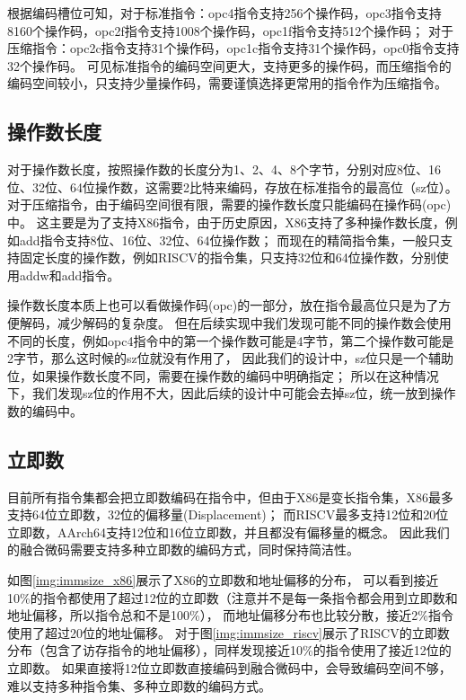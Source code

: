 根据编码槽位可知，对于标准指令：opc4指令支持256个操作码，opc3指令支持8160个操作码，opc2f指令支持1008个操作码，opc1f指令支持512个操作码；
对于压缩指令：opc2c指令支持31个操作码，opc1c指令支持31个操作码，opc0指令支持32个操作码。
可见标准指令的编码空间更大，支持更多的操作码，而压缩指令的编码空间较小，只支持少量操作码，需要谨慎选择更常用的指令作为压缩指令。

\subsection{操作数长度}
对于操作数长度，按照操作数的长度分为1、2、4、8个字节，分别对应8位、16位、32位、64位操作数，这需要2比特来编码，存放在标准指令的最高位（sz位）。
对于压缩指令，由于编码空间很有限，需要的操作数长度只能编码在操作码(opc)中。
这主要是为了支持X86指令，由于历史原因，X86支持了多种操作数长度，例如add指令支持8位、16位、32位、64位操作数；
而现在的精简指令集，一般只支持固定长度的操作数，例如RISCV的指令集，只支持32位和64位操作数，分别使用addw和add指令。

操作数长度本质上也可以看做操作码(opc)的一部分，放在指令最高位只是为了方便解码，减少解码的复杂度。
但在后续实现中我们发现可能不同的操作数会使用不同的长度，例如opc4指令中的第一个操作数可能是4字节，第二个操作数可能是2字节，那么这时候的sz位就没有作用了，
因此我们的设计中，sz位只是一个辅助位，如果操作数长度不同，需要在操作数的编码中明确指定；
所以在这种情况下，我们发现sz位的作用不大，因此后续的设计中可能会去掉sz位，统一放到操作数的编码中。

\subsection{立即数}

目前所有指令集都会把立即数编码在指令中，但由于X86是变长指令集，X86最多支持64位立即数，32位的偏移量(Displacement)；
而RISCV最多支持12位和20位立即数，AArch64支持12位和16位立即数，并且都没有偏移量的概念。
因此我们的融合微码需要支持多种立即数的编码方式，同时保持简洁性。

如图\ref{img:immsize_x86}展示了X86的立即数和地址偏移的分布，
可以看到接近10\%的指令都使用了超过12位的立即数（注意并不是每一条指令都会用到立即数和地址偏移，所以指令总和不是100\%），
而地址偏移分布也比较分散，接近2\%指令使用了超过20位的地址偏移。
对于图\ref{img:immsize_riscv}展示了RISCV的立即数分布（包含了访存指令的地址偏移），同样发现接近10\%的指令使用了接近12位的立即数。
如果直接将12位立即数直接编码到融合微码中，会导致编码空间不够，难以支持多种指令集、多种立即数的编码方式。


